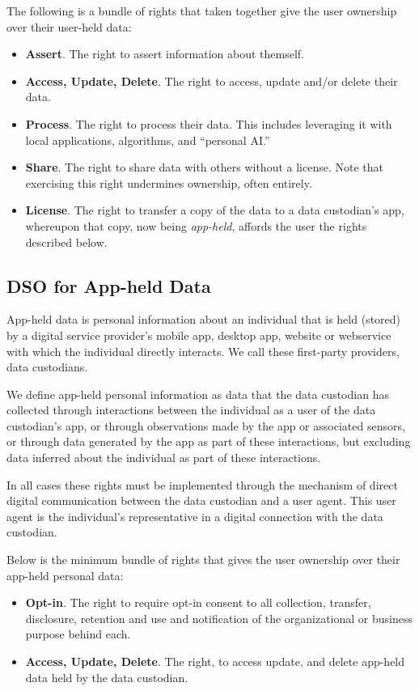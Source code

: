 \documentclass[11pt, oneside]{article}   	%
\begin{document}
The following is a bundle of rights that taken together give the user ownership over their user-held data:
\begin{itemize}
	\item \textbf{Assert}. The right to assert information about themself.
	\item \textbf{Access, Update, Delete}. The right to access, update and/or delete their data. 
	\item \textbf{Process}. The right to process their data. This includes leveraging it with local applications, algorithms, and ``personal AI.''  
	\item \textbf{Share}. The right to share data with others without a license. Note that exercising this right undermines ownership, often entirely.
	\item \textbf{License}. The right to transfer a copy of the data to a data custodian's app, whereupon that copy, now being \emph{app-held}, affords the user the rights described below.
\end{itemize}

\subsection{DSO for App-held Data}
App-held data is personal information about an individual that is held (stored) by a digital service provider's mobile app, desktop app, website or webservice with which the individual directly interacts. We call these first-party providers, data custodians.

We define app-held personal information as data that the data custodian has collected through interactions between the individual as a user of the data custodian's app, or through observations made by the app or associated sensors, or through data generated by the app as part of these interactions, but excluding data inferred about the individual as part of these interactions.

In all cases these rights must be implemented through the mechanism of direct digital communication between the data custodian and a user agent. This user agent is the individual's representative in a digital connection with the data custodian.

Below is the minimum bundle of rights that gives the user ownership over their app-held personal data:
\begin{itemize}
	\item \textbf{Opt-in}. The right to require opt-in consent to all collection, transfer, disclosure, retention and use and notification of the organizational or business purpose behind each.
	\item \textbf{Access, Update, Delete}. The right, to access update, and delete app-held data held by the data custodian. 
\end{itemize}
\end{document}
